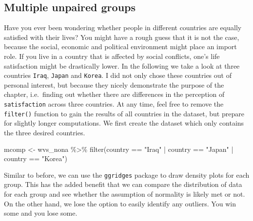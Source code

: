 \documentclass[
]{book}
\newenvironment{Shaded}{\begin{snugshade}}{\end{snugshade}}
\newcommand{\FunctionTok}[1]{\textcolor[rgb]{0.00,0.00,0.00}{#1}}
\newcommand{\NormalTok}[1]{#1}
\newcommand{\OtherTok}[1]{\textcolor[rgb]{0.56,0.35,0.01}{#1}}
\newcommand{\SpecialCharTok}[1]{\textcolor[rgb]{0.00,0.00,0.00}{#1}}
\newcommand{\StringTok}[1]{\textcolor[rgb]{0.31,0.60,0.02}{#1}}
\begin{document}
\hypertarget{multiple-unpaired-groups}{%
\subsection{Multiple unpaired groups}\label{multiple-unpaired-groups}}

Have you ever been wondering whether people in different countries are equally satisfied with their lives? You might have a rough guess that it is not the case, because the social, economic and political environment might place an import role. If you live in a country that is affected by social conflicts, one's life satisfaction might be drastically lower. In the following we take a look at three countries \texttt{Iraq}, \texttt{Japan} and \texttt{Korea}. I did not only chose these countries out of personal interest, but because they nicely demonstrate the purpose of the chapter, i.e.~finding out whether there are differences in the perception of \texttt{satisfaction} across three countries. At any time, feel free to remove the \texttt{filter()} function to gain the results of all countries in the dataset, but prepare for slightly longer computations. We first create the dataset which only contains the three desired countries.

\begin{Shaded}
\begin{Highlighting}[]
\NormalTok{mcomp }\OtherTok{\textless{}{-}}\NormalTok{ wvs\_nona }\SpecialCharTok{\%\textgreater{}\%}
  \FunctionTok{filter}\NormalTok{(country }\SpecialCharTok{==} \StringTok{"Iraq"} \SpecialCharTok{|}
\NormalTok{           country }\SpecialCharTok{==} \StringTok{"Japan"} \SpecialCharTok{|}
\NormalTok{           country }\SpecialCharTok{==} \StringTok{"Korea"}\NormalTok{)}
\end{Highlighting}
\end{Shaded}

Similar to before, we can use the \texttt{ggridges} package to draw density plots for each group. This has the added benefit that we can compare the distribution of data for each group and see whether the assumption of normality is likely met or not. On the other hand, we lose the option to easily identify any outliers. You win some and you lose some.
\end{document}
